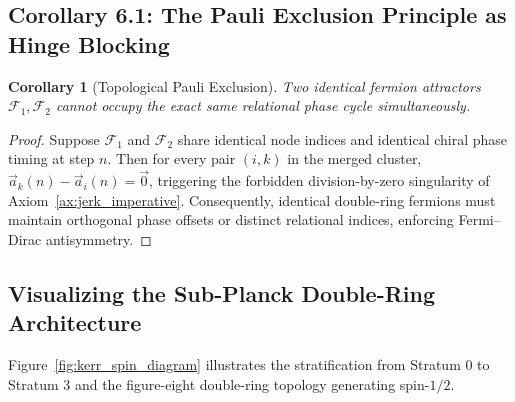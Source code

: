 \documentclass[11pt,a4paper]{article}
\theoremstyle{plain}
\newtheorem{corollary}{Corollary}[theorem]
\theoremstyle{definition}
\theoremstyle{remark}
\newcommand{\Acc}{\vec{a}}
\begin{document}
\subsection{Corollary 6.1: The Pauli Exclusion Principle as Hinge Blocking}
\begin{corollary}[Topological Pauli Exclusion]
\label{cor:pauli}
Two identical fermion attractors $\mathcal{F}_1, \mathcal{F}_2$ cannot occupy the exact same relational phase cycle simultaneously.
\end{corollary}

\begin{proof}
Suppose $\mathcal{F}_1$ and $\mathcal{F}_2$ share identical node indices and identical chiral phase timing at step $n$. Then for every pair $(i, k)$ in the merged cluster, $\Acc_k(n) - \Acc_i(n) = \vec{0}$, triggering the forbidden division-by-zero singularity of Axiom~\ref{ax:jerk_imperative}. Consequently, identical double-ring fermions must maintain orthogonal phase offsets or distinct relational indices, enforcing Fermi--Dirac antisymmetry.
\end{proof}

\subsection{Visualizing the Sub-Planck Double-Ring Architecture}
Figure~\ref{fig:kerr_spin_diagram} illustrates the stratification from Stratum 0 to Stratum 3 and the figure-eight double-ring topology generating spin-$1/2$.
\end{document}

